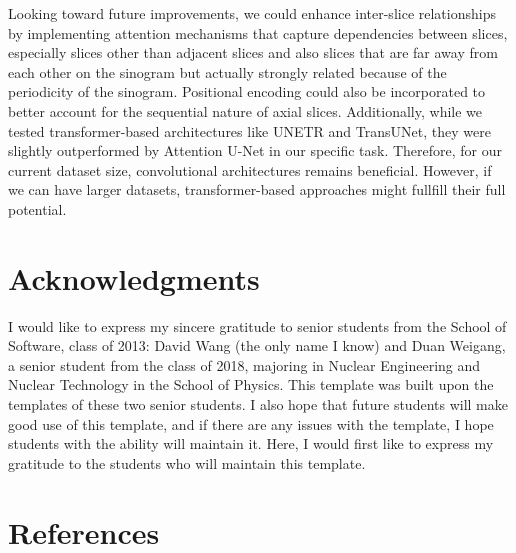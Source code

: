 \documentclass[12pt]{iopart}
\begin{document}
Looking toward future improvements, we could enhance inter-slice relationships by implementing attention mechanisms that capture dependencies between slices, especially slices other than adjacent slices and also slices that are far away from each other on the sinogram but actually strongly related because of the periodicity of the sinogram. Positional encoding could also be incorporated to better account for the sequential nature of axial slices. Additionally, while we tested transformer-based architectures like UNETR and TransUNet, they were slightly outperformed by Attention U-Net in our specific task. 
Therefore,  for our current dataset size, convolutional architectures remains beneficial. However, if we can have larger datasets, transformer-based approaches might fullfill their full potential.




\section{Acknowledgments}
I would like to express my sincere gratitude to senior students from the School of Software, class of 2013: David Wang (the only name I know) and Duan Weigang, a senior student from the class of 2018, majoring in Nuclear Engineering and Nuclear Technology in the School of Physics. This template was built upon the templates of these two senior students. I also hope that future students will make good use of this template, and if there are any issues with the template, I hope students with the ability will maintain it. Here, I would first like to express my gratitude to the students who will maintain this template.

\section*{References}

\nocite{*}


\end{document}
